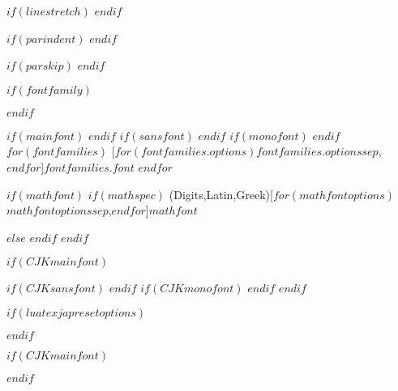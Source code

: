 
\setlength{\headsep}{1cm}
\setlength{\footskip}{1cm}
\checkandfixthelayout[fixed]


\renewcommand{\familydefault}{\rmdefault}

$if(linestretch)$
\renewcommand{\baselinestretch}{$linestretch$}
$endif$

$if(parindent)$
\setlength{\parindent}{$parindent$}
$endif$

$if(parskip)$
\setlength{\parskip}{$parskip$}
$endif$


$if(fontfamily)$
\usepackage[$for(fontfamilyoptions)$$fontfamilyoptions$$sep$,$endfor$]{$fontfamily$}
$endif$

\ifPDFTeX\else
$if(mainfont)$
$endif$
$if(sansfont)$
$endif$
$if(monofont)$
$endif$
$for(fontfamilies)$
  [$for(fontfamilies.options)$$fontfamilies.options$$sep$,$endfor$]{$fontfamilies.font$}
$endfor$

$if(mathfont)$
$if(mathspec)$
  \ifXeTeX
    \setmathfont(Digits,Latin,Greek)[$for(mathfontoptions)$$mathfontoptions$$sep$,$endfor$]{$mathfont$}
  \else
  \fi

$else$
$endif$
$endif$

$if(CJKmainfont)$
  \ifXeTeX
    \usepackage{xeCJK}
$if(CJKsansfont)$
$endif$
$if(CJKmonofont)$
$endif$
  \fi
$endif$

$if(luatexjapresetoptions)$
  \ifLuaTeX
    \usepackage[$for(luatexjapresetoptions)$$luatexjapresetoptions$$sep$,$endfor$]{luatexja-preset}
  \fi
$endif$

$if(CJKmainfont)$
  \ifLuaTeX
    \usepackage[$for(luatexjafontspecoptions)$$luatexjafontspecoptions$$sep$,$endfor$]{luatexja-fontspec}
  \fi
$endif$
\fi


